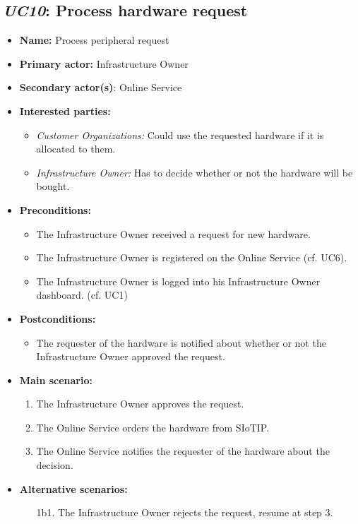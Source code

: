 \documentclass[english]{sareport}
\begin{document}
\subsection{\emph{UC10}: Process hardware request}
\begin{itemize}
    \item \textbf{Name:} Process peripheral request
    \item \textbf{Primary actor:} Infrastructure Owner
    \item \textbf{Secondary actor(s)}: Online Service
    \item \textbf{Interested parties:} 
        \begin{itemize}
            \item \textit{Customer Organizations:} Could use the requested hardware if it is allocated to them.
            \item \textit{Infrastructure Owner:} Has to decide whether or not the hardware will be bought.
        \end{itemize}

    \item \textbf{Preconditions:}
        \begin{itemize}
            \item The Infrastructure Owner received a request for new hardware.
            \item The Infrastructure Owner is registered on the Online Service (cf. UC6).
            \item The Infrastructure Owner is logged into his Infrastructure Owner dashboard. (cf. UC1)
        \end{itemize}

    \item \textbf{Postconditions:}
        \begin{itemize}
            \item The requester of the hardware is notified about whether or not the Infrastructure Owner approved the request.
        \end{itemize}
        
    \item \textbf{Main scenario:} 
    \begin{enumerate}
       \item The Infrastructure Owner approves the request.
       \item The Online Service orders the hardware from SIoTIP.
       \item The Online Service notifies the requester of the hardware about the decision.
    \end{enumerate}

    \item \textbf{Alternative scenarios:} 
    \begin{enumerate}
        \item [1b1.] The Infrastructure Owner rejects the request, resume at step 3.
    \end{enumerate}
\end{itemize}
\end{document}
